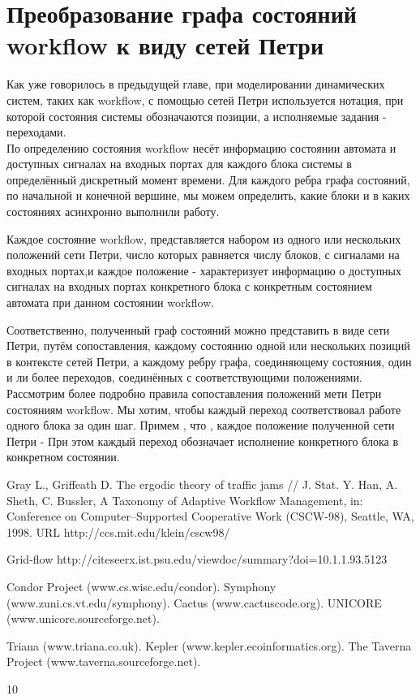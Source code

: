 \documentclass[a4paper,12pt]{article}
\begin{document}
\section{Преобразование графа состояний workflow к виду сетей Петри}
Как уже говорилось в предыдущей главе, при моделировании динамических систем, таких как workflow, с помощью сетей Петри используется нотация, при которой состояния системы  обозначаются позиции, а исполняемые задания - переходами.\\

По определению состояния workflow несёт информацию состоянии автомата и доступных сигналах на входных портах для каждого блока системы в определённый дискретный момент времени. Для каждого ребра графа состояний, по начальной и конечной вершине, мы можем определить, какие блоки и в каких состояниях асинхронно выполнили работу. 

Каждое состояние workflow, представляется набором из одного или нескольких положений сети Петри, число которых равняется числу блоков, с сигналами на входных портах,и каждое положение - характеризует информацию о доступных сигналах на  входных портах конкретного блока с конкретным состоянием автомата при данном состоянии workflow.

 Соответственно, полученный граф состояний можно представить в виде сети Петри, путём сопоставления, каждому состоянию одной или нескольких позиций в контексте сетей Петри, а каждому ребру графа, соединяющему состояния, один и ли более переходов, соединённых с соответствующими положениями. \\

Рассмотрим более подробно правила сопоставления положений мети Петри состояниям workflow. Мы хотим, чтобы каждый переход соответствовал работе одного блока за один шаг. 
Примем , что   , каждое положение полученной сети Петри - 
При этом каждый переход обозначает исполнение конкретного блока в конкретном состоянии.






\begin{thebibliography}{10}
 Gray L., Griffeath D. The ergodic theory of traffic jams // J. Stat. 
 Y. Han, A. Sheth, C. Bussler, A Taxonomy of Adaptive Workflow Management, in:
Conference on Computer–Supported Cooperative Work (CSCW-98), Seattle, WA,
1998.
URL http://ccs.mit.edu/klein/cscw98/


Grid-flow http://citeseerx.ist.psu.edu/viewdoc/summary?doi=10.1.1.93.5123

 Condor Project (www.cs.wisc.edu/condor).
 Symphony (www.zuni.cs.vt.edu/symphony).
 Cactus (www.cactuscode.org).
 UNICORE (www.unicore.sourceforge.net).


 Triana (www.triana.co.uk).
 Kepler (www.kepler.ecoinformatics.org).
 The Taverna Project (www.taverna.sourceforge.net).



\end{thebibliography}{10}
\end{document}
